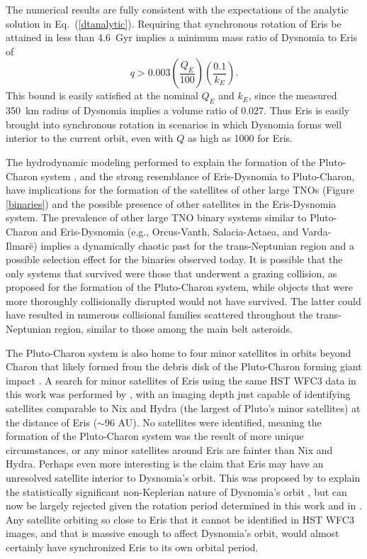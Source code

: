 \documentclass[onecolumn]{aastex631}
\begin{document}
The numerical results are fully consistent with the expectations of the analytic solution in Eq.~(\ref{dtanalytic}). 
Requiring that synchronous rotation of Eris be attained in less than 4.6~Gyr implies a minimum mass ratio of Dysnomia to Eris of
\begin{equation}
  q > 0.003  \left(\frac{Q_E}{100}\right) \left(\frac{0.1}{k_E}\right).
\end{equation}
This bound is easily satisfied at the nominal $Q_E$ and $k_E$, since the measured 350~km radius
of Dysnomia implies a volume ratio of 0.027.  Thus Eris is easily brought into synchronous rotation in scenarios in which Dysnomia forms well interior to the current orbit, even with $Q$ as high as 1000 for Eris.

The hydrodynamic modeling performed to explain the formation of the Pluto-Charon system \citep{Canup2005}, and the strong resemblance of Eris-Dysnomia to Pluto-Charon, have implications for the formation of the satellites of other large TNOs (Figure \ref{binaries}) and the possible presence of other satellites in the Eris-Dysnomia system. The prevalence of other large TNO binary systems similar to Pluto-Charon and Eris-Dysnomia (e.g., Orcus-Vanth, Salacia-Actaea, and Varda-Ilmar{\"e}) implies a dynamically chaotic past for the trans-Neptunian region and a possible selection effect for the binaries observed today. It is possible that the only systems that survived were those that underwent a grazing collision, as proposed for the formation of the Pluto-Charon system, while objects that were more thoroughly collisionally disrupted would not have survived. The latter could have resulted in numerous collisional families scattered throughout the trans-Neptunian region, similar to those among the main belt asteroids.

The Pluto-Charon system is also home to four minor satellites in orbits beyond Charon \citep{Weaver06,Showalter11,Showalter12} that likely formed from the debris disk of the Pluto-Charon forming giant impact \citep{Canup2011}. A search for minor satellites of Eris using the same HST WFC3 data in this work was performed by \citet{Murray18}, with an imaging depth just capable of identifying satellites comparable to Nix and Hydra (the largest of Pluto's minor satellites) at the distance of Eris ($\sim$96 AU). No satellites were identified, meaning the formation of the Pluto-Charon system was the result of more unique circumstances, or any minor satellites around Eris are fainter than Nix and Hydra. Perhaps even more interesting is the claim that Eris may have an unresolved satellite interior to Dysnomia's orbit. This was proposed by \citet{Spencer21} to explain the statistically significant non-Keplerian nature of Dysnomia's orbit \citep{H21}, but can now be largely rejected given the rotation period determined in this work and in \citet{szakats}. Any satellite orbiting so close to Eris that it cannot be identified in HST WFC3 images, and that is massive enough to affect Dysnomia's orbit, would almost certainly have synchronized Eris to its own orbital period.
\end{document}
